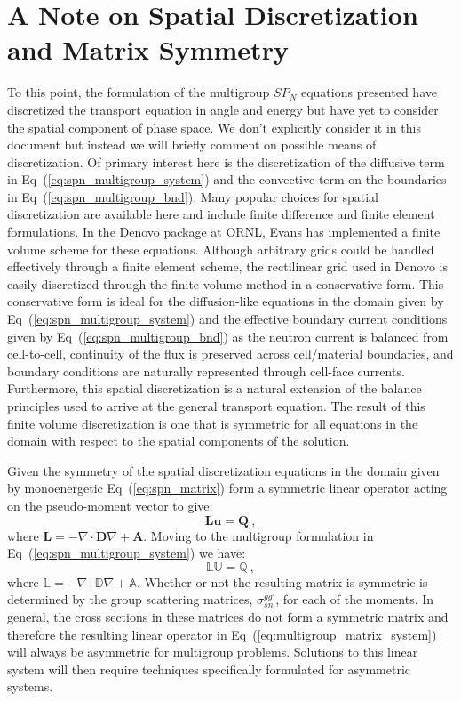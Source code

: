 \section{A Note on Spatial Discretization and Matrix Symmetry}
\label{sec:spatial_discretization}
To this point, the formulation of the multigroup $SP_N$ equations
presented have discretized the transport equation in angle and energy
but have yet to consider the spatial component of phase space. We
don't explicitly consider it in this document but instead we will
briefly comment on possible means of discretization. Of primary
interest here is the discretization of the diffusive term in
Eq~(\ref{eq:spn_multigroup_system}) and the convective term on the
boundaries in Eq~(\ref{eq:spn_multigroup_bnd}). Many popular choices
for spatial discretization are available here and include finite
difference and finite element formulations. In the Denovo package at
ORNL, Evans has implemented a finite volume scheme for these
equations. Although arbitrary grids could be handled effectively
through a finite element scheme, the rectilinear grid used in Denovo
is easily discretized through the finite volume method in a
conservative form. This conservative form is ideal for the
diffusion-like equations in the domain given by
Eq~(\ref{eq:spn_multigroup_system}) and the effective boundary current
conditions given by Eq~(\ref{eq:spn_multigroup_bnd}) as the neutron
current is balanced from cell-to-cell, continuity of the flux is
preserved across cell/material boundaries, and boundary conditions are
naturally represented through cell-face currents. Furthermore, this
spatial discretization is a natural extension of the balance
principles used to arrive at the general transport equation. The
result of this finite volume discretization is one that is symmetric
for all equations in the domain with respect to the spatial components
of the solution.

Given the symmetry of the spatial discretization equations in the
domain given by monoenergetic Eq~(\ref{eq:spn_matrix}) form a
symmetric linear operator acting on the pseudo-moment vector to give:
\begin{equation}
  \mathbf{L}\mathbf{u}=\mathbf{Q}\:,
  \label{eq:matrix_system}
\end{equation}
where $\mathbf{L} = -\nabla \cdot \mathbf{D} \nabla +
\mathbf{A}$. Moving to the multigroup formulation in
Eq~(\ref{eq:spn_multigroup_system}) we have:
\begin{equation}
  \mathbb{L}\mathbb{U}=\mathbb{Q}\:,
  \label{eq:multigroup_matrix_system}
\end{equation}
where $\mathbb{L} = -\nabla \cdot \mathbb{D} \nabla +
\mathbb{A}$. Whether or not the resulting matrix is symmetric is
determined by the group scattering matrices, $\sigma_{sn}^{gg'}$, for
each of the moments. In general, the cross sections in these matrices
do not form a symmetric matrix and therefore the resulting linear
operator in Eq~(\ref{eq:multigroup_matrix_system}) will always be
asymmetric for multigroup problems. Solutions to this linear system
will then require techniques specifically formulated for asymmetric
systems.
